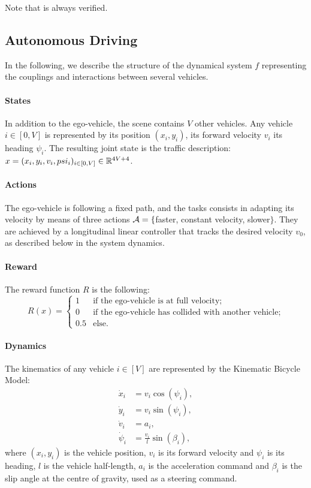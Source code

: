 \documentclass{article}
\begin{document}
Note that  is always verified. 

\subsection{Autonomous Driving}

In the following, we describe the structure of the dynamical system $f$ representing the couplings and interactions between several vehicles.

\paragraph{States}

In addition to the ego-vehicle, the scene contains $V$ other vehicles. Any vehicle $i\in[0,V]$ is represented by its position $(x_i, y_i)$, its forward velocity $v_i$ its heading $\psi_i$. The resulting joint state is the traffic description: $x = (x_i, y_i, v_i, psi_i)_{i\in[0,V]}\in\mathbb{R}^{4V+4}$.

\paragraph{Actions}

The ego-vehicle is following a fixed path, and the tasks consists in adapting its velocity by means of three actions $\mathcal{A} = \{$faster, constant velocity, slower$\}$. They are achieved by a longitudinal linear controller that tracks the desired velocity $v_0$, as described below in the system dynamics.

\paragraph{Reward}

The reward function $R$ is the following:
\[
R(x) = 
\begin{cases}
1 & \text{if the ego-vehicle is at full velocity;}\\
0 & \text{if the ego-vehicle has collided with another vehicle;}\\
0.5 & \text{else.}
\end{cases}\]

\paragraph{Dynamics}

The kinematics of any vehicle $i\in[V]$ are represented by the Kinematic Bicycle Model:
\begin{align}
\dot{x}_i &= v_i\cos(\psi_i), \nonumber\\
\dot{y}_i &= v_i\sin(\psi_i), \nonumber\\
\dot{v}_i &= a_i, \nonumber\\
\dot{\psi}_i &= \frac{v_i}{l}\sin(\beta_i), \nonumber
\end{align}
where $(x_i, y_i)$ is the vehicle position, $v_i$ is its forward velocity and $\psi_i$ is its heading, $l$ is the vehicle half-length, $a_i$ is the acceleration command and $\beta_i$ is the slip angle at the centre of gravity, used as a steering command.
\end{document}
